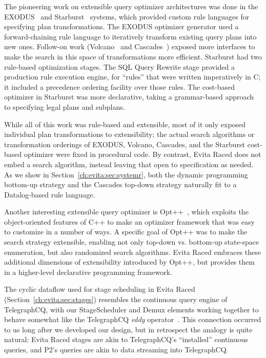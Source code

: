 The pioneering work on extensible query optimizer architectures was done in the
EXODUS~\cite{exodus} and Starburst~\cite{lohman,phh92} systems, which provided
custom rule languages for specifying plan transformations.  The EXODUS
optimizer generator used a forward-chaining rule language to iteratively
transform existing query plans into new ones.  Follow-on work
(Volcano~\cite{volcano} and Cascades~\cite{cascades}) exposed more interfaces
to make the search in this space of transformations more efficient.  Starburst
had two rule-based optimization stages.  The SQL Query Rewrite stage provided a
production rule execution engine, for ``rules'' that were written imperatively
in C; it included a precedence ordering facility over those rules.  The
cost-based optimizer in Starburst was more declarative, taking a grammar-based
approach to specifying legal plans and subplans.

While all of this work was rule-based and extensible, most of it only exposed
individual plan transformations to extensibility; the actual search algorithms
or transformation orderings of EXODUS, Volcano, Cascades, and the Starburst
cost-based optimizer were fixed in procedural code.  By contrast, Evita Raced
does not embed a search algorithm, instead leaving that open to specification
as needed.  As we show in Section~\ref{ch:evita:sec:systemr}, both the dynamic programming
bottom-up strategy and the Cascades top-down strategy naturally fit to a
Datalog-based rule language.

Another interesting extensible query optimizer is Opt++~\cite{kabradewitt},
which exploits the object-oriented features of C++ to make an optimizer
framework that was easy to customize in a number of ways.  A specific goal of
Opt++ was to make the search strategy extensible, enabling not only top-down
vs.  bottom-up state-space enumeration, but also randomized search algorithms.
Evita Raced embraces these additional dimensions of extensibility introduced by
Opt++, but provides them in a higher-level declarative programming framework.

The cyclic dataflow used for stage scheduling in Evita Raced
(Section~\ref{ch:evita:sec:stages}) resembles the continuous query engine of
TelegraphCQ, with our StageScheduler and Demux elements working together to
behave somewhat like the TelegraphCQ {\em eddy} operator~\cite{tcq-cidr}.  This
connection occurred to us long after we developed our design, but in retrospect
the analogy is quite natural: Evita Raced stages are akin to TelegraphCQ's
``installed'' continuous queries, and P2's \OVERLOG queries are akin to data
streaming into TelegraphCQ.

